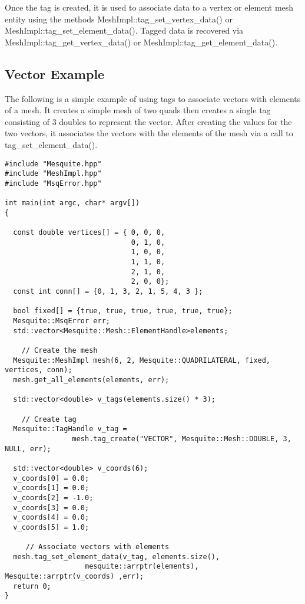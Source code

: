 Once the tag is created, it is used to associate data to a vertex or element mesh entity using the methods MeshImpl::tag\_set\_vertex\_data() or MeshImpl::tag\_set\_element\_data().  Tagged data is recovered via MeshImpl::tag\_get\_vertex\_data() or MeshImpl::tag\_get\_element\_data().


\subsection{Vector Example}

The following is a simple example of using tags to associate vectors with elements of a mesh. It creates a simple mesh of two quads then creates a single tag consisting of 3 doubles to represent the vector. After creating the values for the two vectors, it associates the vectors with the elements of the mesh via a call to tag\_set\_element\_data().

\begin{lstlisting}
#include "Mesquite.hpp"
#include "MeshImpl.hpp"
#include "MsqError.hpp"

int main(int argc, char* argv[])
{

  const double vertices[] = { 0, 0, 0,
                              0, 1, 0,
                              1, 0, 0,
                              1, 1, 0,
                              2, 1, 0,
                              2, 0, 0};
  const int conn[] = {0, 1, 3, 2, 1, 5, 4, 3 };

  bool fixed[] = {true, true, true, true, true, true};
  Mesquite::MsqError err;
  std::vector<Mesquite::Mesh::ElementHandle>elements;

    // Create the mesh
  Mesquite::MeshImpl mesh(6, 2, Mesquite::QUADRILATERAL, fixed, vertices, conn);
  mesh.get_all_elements(elements, err);

  std::vector<double> v_tags(elements.size() * 3);

    // Create tag
  Mesquite::TagHandle v_tag = 
                mesh.tag_create("VECTOR", Mesquite::Mesh::DOUBLE, 3, NULL, err);

  std::vector<double> v_coords(6);
  v_coords[0] = 0.0;
  v_coords[1] = 0.0;
  v_coords[2] = -1.0;
  v_coords[3] = 0.0;
  v_coords[4] = 0.0;
  v_coords[5] = 1.0;

     // Associate vectors with elements
  mesh.tag_set_element_data(v_tag, elements.size(), 
                   mesquite::arrptr(elements), Mesquite::arrptr(v_coords) ,err);
  return 0;
}
\end{lstlisting}

